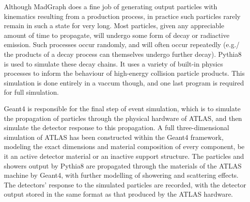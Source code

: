     Although MadGraph does a fine job of generating output particles with kinematics resulting from a production process,
        in practice such particles rarely remain in such a state for very long.
    Most particles, given any appreciable amount of time to propagate, will undergo some form of decay or radiactive emission.
    Such processes occur randomly, and will often occur repeatedly
        (e.g./ the products of a decay process can themselves undergo further decay).
    Pythia8 is used to simulate these decay chains.
    It uses a variety of built-in physics processes to inform the behaviour of high-energy collision particle products.
    This simulation is done entirely in a vaccum though, and one last program is required for full simulation.

    Geant4 is responsible for the final step of event simulation,
        which is to simulate the propagation of particles through the physical hardware of ATLAS,
        and then simulate the detector response to this propagation.
    A full three-dimensional simulation of ATLAS has been constructed within the Geant4 framework,
        modeling the exact dimensions and material composition of every component,
        be it an active detector material or an inactive support structure.
    The particles and showers output by Pythia8 are propagated through the materials of the ATLAS machine by Geant4,
        with further modelling of showering and scattering effects.
    The detectors' response to the simulated particles are recorded, with the detector output stored in the same format as that produced by the ATLAS hardware.



